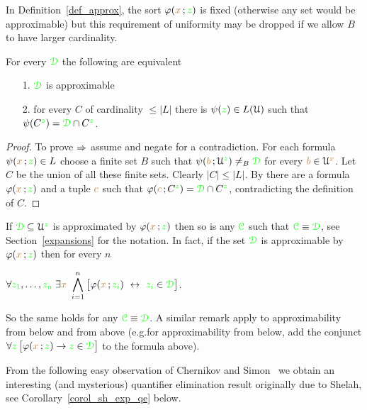 In Definition~\ref{def_approx}, the sort $\varphi({\color{brown} x}\,;{\color{green} z})$ is fixed (otherwise any set would be approximable) but this requirement of uniformity may be dropped if we allow $B$ to have larger cardinality.

\begin{proposition}\label{lem_approx_nonunif}
For every ${\color{green}\EuScript D}$ the following are equivalent
\begin{itemize}
\item[1.] ${\color{green}\EuScript D}$ is approximable
\item[2.] for every $C$ of cardinality $\le|L|$ there is $\psi({\color{green} z})\in L(\EuScript U)$ such that $\psi(C^{\color{green} z})={\color{green}\EuScript D}\cap C^{\color{green} z}$.
\end{itemize}
\end{proposition}

\begin{proof}
To prove $\Rightarrow$ assume  and negate  for a contradiction.
For each formula $\psi({\color{brown} x}\,;{\color{green} z})\in L$ choose a finite set $B$ such that $\psi({\color{brown} b}\,;\EuScript U^{\color{green} z})\neq_B{\color{green}\EuScript D}$ for every ${\color{brown} b}\in\EuScript U^{\color{brown} x}$.
Let $C$ be the union of all these finite sets.
Clearly $|C|\le|L|$.
By  there are a formula $\varphi({\color{brown} x}\,;{\color{green} z})$ and a tuple ${\color{brown} c}$ such that $\varphi({\color{brown} c}\,;C^{\color{green} z})={\color{green}\EuScript D}\cap C^{\color{green} z}$, contradicting the definition of $C$.
\end{proof}

\begin{remark}\label{prop_approx_el_eq}
If ${\color{green}\EuScript D}\subseteq\EuScript U^{\color{green} z}$ is approximated by $\varphi({\color{brown} x}\,;{\color{green} z})$ then so is any ${\color{green}\EuScript C}$ such that ${\color{green}\EuScript C}\equiv{\color{green}\EuScript D}$, see Section~\ref{expansions} for the notation.
In fact, if the set ${\color{green}\EuScript D}$ is approximable by $\varphi({\color{brown} x}\,;{\color{green} z})$ then for every $n$

\hfil$\displaystyle\A {\gr z_1},\dots,{\gr z_n}\;\E {\mr x}\ \bigwedge^n_{i=1}\big[\phi({\mr x}\,;{\gr z_i})\ \iff\ {\gr z_i}\in{\gr \D}\big]$.

So the same holds for any ${\color{green}\EuScript C}\equiv{\color{green}\EuScript D}$.
A similar remark apply to approximability from below and from above (e.g.\@ for approximability from below, add the conjunct $\forall {\color{green}z}\,\big[\varphi({\color{brown} x}\,;{\color{green} z})\rightarrow {\color{green}z}\in{\color{green}\EuScript D}\big]$ to the formula above).
\end{remark}

From the following easy observation of Chernikov and Simon~\cite{CS} we obtain an interesting (and mysterious) quantifier elimination result originally due to Shelah, see Corollary~\ref{corol_sh_exp_qe} below.

